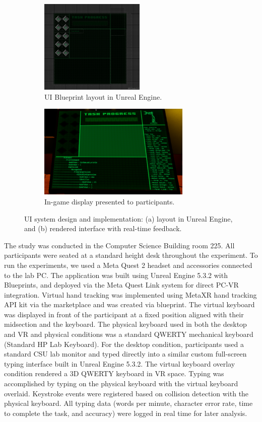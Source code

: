 \documentclass[acmlarge]{acmart}
\begin{document}
\begin{figure}[htbp]
    \centering

    \begin{subfigure}[t]{0.48\linewidth}
        \centering
        \includegraphics[height=4.5cm]{Monitor_UI.png}
        \caption{UI Blueprint layout in Unreal Engine.}
        \label{fig:monitor_ui}
    \end{subfigure}
    \hfill
    \begin{subfigure}[t]{0.48\linewidth}
        \centering
        \includegraphics[height=4.5cm]{task_progress.png}
        \caption{In-game display presented to participants.}
        \label{fig:task_progress_render}
    \end{subfigure}

    \caption{UI system design and implementation: (a) layout in Unreal Engine, and (b) rendered interface with real-time feedback.}
    \label{fig:apparatus_ui}
\end{figure}


The study was conducted in the Computer Science Building room 225. All participants were seated at a standard height desk throughout the experiment. To run the experiments, we used a Meta Quest 2 headset and accessories connected to the lab PC. The application was built using Unreal Engine 5.3.2 with Blueprints, and deployed via the Meta Quest Link system for direct PC-VR integration. Virtual hand tracking was implemented using MetaXR hand tracking API kit via the marketplace and was created via blueprint. The virtual keyboard was displayed in front of the participant at a fixed position aligned with their midsection and the keyboard. The physical keyboard used in both the desktop and VR and physical conditions was a standard QWERTY mechanical keyboard (Standard HP Lab Keyboard). For the desktop condition, participants used a standard CSU lab monitor and typed directly into a similar custom full-screen typing interface built in Unreal Engine 5.3.2. The virtual keyboard overlay condition rendered a 3D QWERTY keyboard in VR space. Typing was accomplished by typing on the physical keyboard with the virtual keyboard overlaid. Keystroke events were registered based on collision detection with the physical keyboard. All typing data (words per minute, character error rate, time to complete the task, and accuracy) were logged in real time for later analysis.
\end{document}
